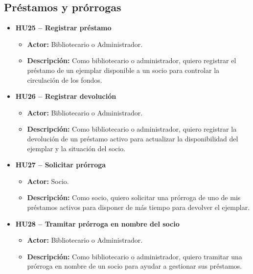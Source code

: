 \subsection{Préstamos y prórrogas}
\begin{itemize}
	\item \textbf{HU25 -- Registrar préstamo}
	\begin{itemize}
		\item \textbf{Actor:} Bibliotecario o Administrador.
		\item \textbf{Descripción:} Como bibliotecario o administrador, quiero registrar el préstamo de un ejemplar disponible a un socio para controlar la circulación de los fondos.
	\end{itemize}
	
	\item \textbf{HU26 -- Registrar devolución}
	\begin{itemize}
		\item \textbf{Actor:} Bibliotecario o Administrador.
		\item \textbf{Descripción:} Como bibliotecario o administrador, quiero registrar la devolución de un préstamo activo para actualizar la disponibilidad del ejemplar y la situación del socio.
	\end{itemize}
	
	\item \textbf{HU27 -- Solicitar prórroga}
	\begin{itemize}
		\item \textbf{Actor:} Socio.
		\item \textbf{Descripción:} Como socio, quiero solicitar una prórroga de uno de mis préstamos activos para disponer de más tiempo para devolver el ejemplar.
	\end{itemize}
	
	\item \textbf{HU28 -- Tramitar prórroga en nombre del socio}
	\begin{itemize}
		\item \textbf{Actor:} Bibliotecario o Administrador.
		\item \textbf{Descripción:} Como bibliotecario o administrador, quiero tramitar una prórroga en nombre de un socio para ayudar a gestionar sus préstamos.
	\end{itemize}
\end{itemize}

